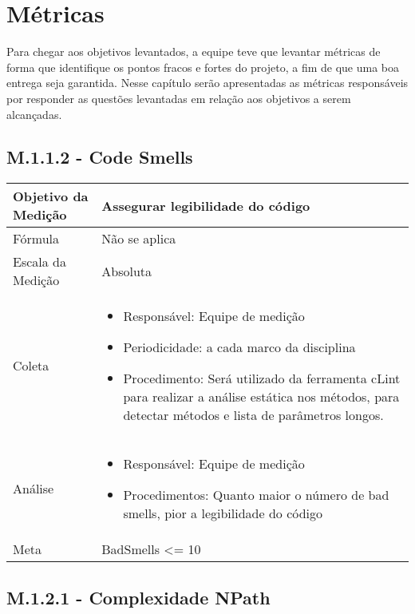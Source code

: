 \chapter{Métricas}
	
	Para chegar aos objetivos levantados, a equipe teve que levantar métricas de forma que identifique os pontos fracos e fortes do projeto, a fim de que uma boa entrega seja garantida.
	Nesse capítulo serão apresentadas as métricas responsáveis por responder as questões levantadas em relação aos objetivos a serem alcançadas.

\section{M.1.1.2 - Code Smells} %

	\begin{tabular}{ |p{4cm}|p{8cm}|  }
	 \hline
	 Objetivo da Medição 		& 	 Assegurar legibilidade do código  \\
	 \hline
	 Fórmula		& 	Não se aplica	\\
	 \hline
	 Escala da Medição 		& 	Absoluta	 \\
	 \hline
	 Coleta		& 	\begin{itemize} \item Responsável: Equipe de medição \item Periodicidade: a cada marco da disciplina \item Procedimento: Será utilizado da ferramenta cLint para realizar a análise estática nos métodos, para detectar métodos e lista de parâmetros longos. \end{itemize} \\
	 \hline
	 Análise		& 	\begin{itemize} \item Responsável: Equipe de medição \item Procedimentos: Quanto maior o número de bad smells, pior a legibilidade do código \end{itemize} 	 \\
	 \hline
	 Meta		& 	BadSmells <= 10	 \\
	 \hline
	\end{tabular}

\section{M.1.2.1 - Complexidade NPath}

